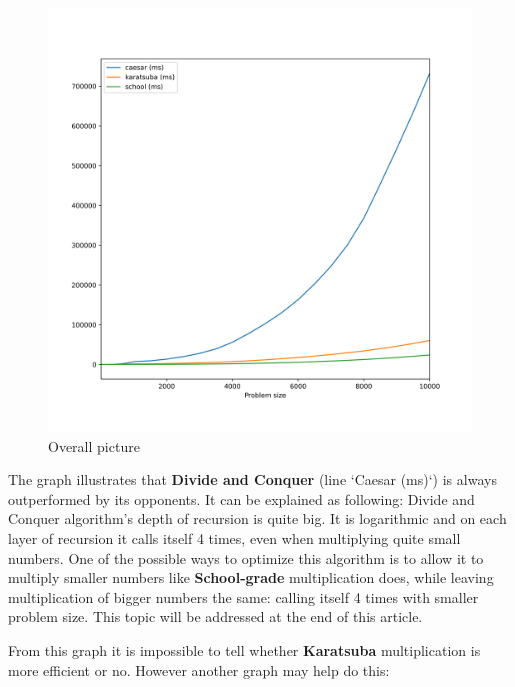 \documentclass[12pt, oneside]{article}
\begin{document}
\begin{figure}[h]
\caption{Overall picture}
\centering
\includegraphics[width=1\textwidth]{Overview}
\end{figure}
The graph illustrates that \textbf{Divide and Conquer} (line `Caesar (ms)`) is always outperformed by its opponents. It can be explained as following: Divide and Conquer algorithm's depth of recursion is quite big. It is logarithmic and on each layer of recursion it calls itself 4 times, even when multiplying quite small numbers. One of the possible ways to optimize this algorithm is to allow it to multiply smaller numbers like \textbf{School-grade} multiplication does, while leaving multiplication of bigger numbers the same: calling itself 4 times with smaller problem size.  This topic will be addressed at the end of this article.

From this graph it is impossible to tell whether \textbf{Karatsuba} multiplication is more efficient or no. However another graph may help do this:
\end{document}
